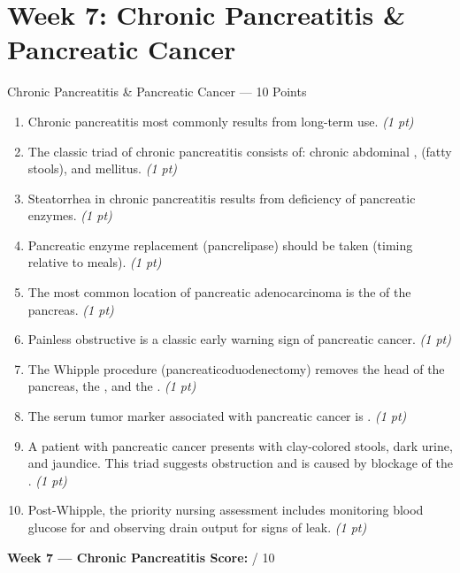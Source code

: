 \documentclass[11pt,letterpaper]{article}
\newcommand{\blank}[1][3cm]{\underline{\hspace{#1}}}
\begin{document}
\newpage

\section{Week 7: Chronic Pancreatitis \& Pancreatic Cancer}

\begin{diagbox}{Chronic Pancreatitis \& Pancreatic Cancer --- 10 Points}

\begin{enumerate}[leftmargin=1.5em, label=\textbf{\arabic*.},start=31]

  \item Chronic pancreatitis most commonly results from long-term
        \blank[3cm] use.
        \hfill\textit{(1 pt)}

  \item The classic triad of chronic pancreatitis consists of: chronic abdominal
        \blank[3cm], \blank[3cm] (fatty stools), and \blank[3cm] mellitus.
        \hfill\textit{(1 pt)}

  \item Steatorrhea in chronic pancreatitis results from deficiency of pancreatic
        \blank[4cm] enzymes.
        \hfill\textit{(1 pt)}

  \item Pancreatic enzyme replacement (pancrelipase) should be taken
        \blank[5cm] (timing relative to meals).
        \hfill\textit{(1 pt)}

  \item The most common location of pancreatic adenocarcinoma is the
        \blank[3cm] of the pancreas.
        \hfill\textit{(1 pt)}

  \item Painless obstructive \blank[3cm] is a classic early warning sign of
        pancreatic cancer.
        \hfill\textit{(1 pt)}

  \item The Whipple procedure (pancreaticoduodenectomy) removes the head of the
        pancreas, the \blank[3cm], and the \blank[3cm].
        \hfill\textit{(1 pt)}

  \item The serum tumor marker associated with pancreatic cancer is
        \blank[2cm].
        \hfill\textit{(1 pt)}

  \item A patient with pancreatic cancer presents with clay-colored stools, dark
        urine, and jaundice.  This triad suggests \blank[3cm] obstruction and is
        caused by blockage of the \blank[4cm].
        \hfill\textit{(1 pt)}

  \item Post-Whipple, the priority nursing assessment includes monitoring blood
        glucose for \blank[4cm] and observing drain output for signs of
        \blank[4cm] leak.
        \hfill\textit{(1 pt)}

\end{enumerate}

\vspace{0.3cm}
\textbf{Week 7 --- Chronic Pancreatitis Score:} \blank[1cm] / 10
\end{diagbox}
\end{document}
